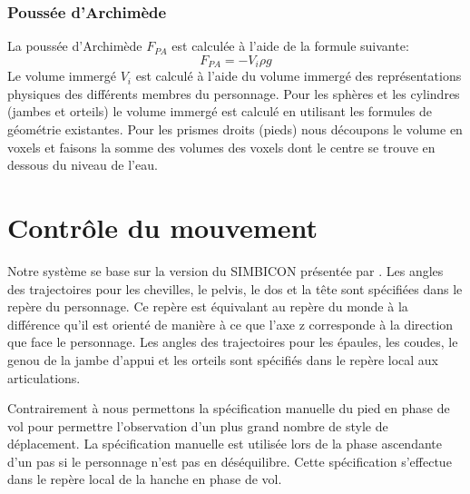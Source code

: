 \documentclass[runningheads,a4paper]{llncs}
\begin{document}
\subsubsection{Poussée d'Archimède}
%
La poussée d'Archimède $F_{PA}$ est calculée à l'aide de la formule suivante:
\[
F_{PA}=-V_i \rho g
\]
Le volume immergé \(V_i\) est calculé à l'aide du volume immergé des représentations physiques des différents membres du personnage.  Pour les sphères et les cylindres (jambes et orteils) le volume immergé est calculé en utilisant les formules de géométrie existantes. Pour les prismes droits (pieds) nous découpons le volume en voxels et faisons la somme des volumes des voxels dont le centre se trouve en dessous du niveau de l'eau.
%
\section{Contrôle du mouvement}
%
Notre système se base sur la version du SIMBICON présentée par \cite{coros2010generalized}. Les angles des trajectoires pour les chevilles, le pelvis, le dos et la tête sont spécifiées dans le repère du personnage. Ce repère est équivalant au repère du monde à la différence qu'il est orienté de manière à ce que l'axe z corresponde à la direction que face le personnage. Les angles des trajectoires pour les épaules, les coudes, le genou de la jambe d'appui et les orteils sont spécifiés dans le repère local aux articulations.

Contrairement à \cite{coros2010generalized} nous permettons la spécification manuelle du pied en phase de vol pour permettre l'observation d'un plus grand nombre de style de déplacement. La spécification manuelle est utilisée lors de la phase ascendante d'un pas si le personnage n'est pas en déséquilibre. Cette spécification s'effectue dans le repère local de la hanche en phase de vol.

%
\end{document}
